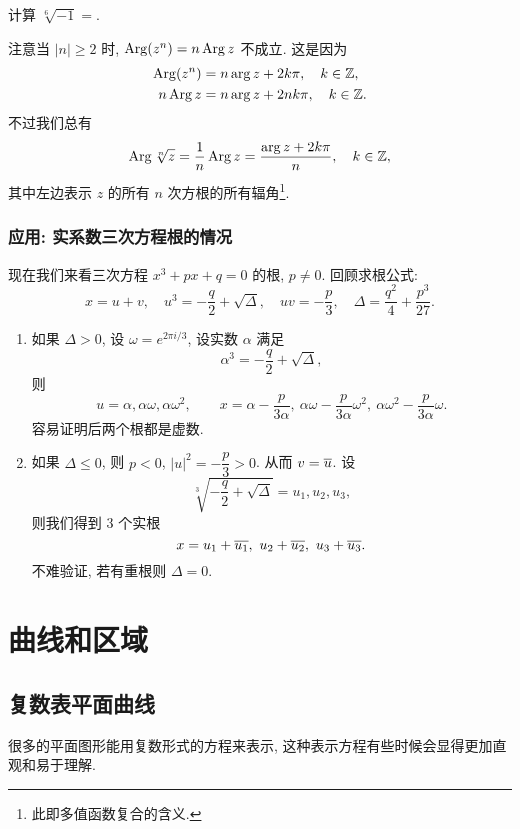 \begin{exercise}
  计算 $\sqrt[6]{-1}=$\fillblank[5cm][2mm]{}.
\end{exercise}

注意当 $|n|\ge 2$ 时, \alert{$\operatorname{Arg}(z^n)=n\operatorname{Arg} z$ 不成立}.
这是因为
  \begin{align*}
    \operatorname{Arg}(z^n)&=n\arg z+2k\pi,\quad k\in{\mathbb{Z}},\\
    n\operatorname{Arg} z&=n\arg z+2nk\pi,\quad k\in{\mathbb{Z}}.
  \end{align*}
不过我们总有
  \[\operatorname{Arg} \sqrt[n]z=\dfrac1n\operatorname{Arg} z=\dfrac{\arg z+2k\pi}n,\quad k\in{\mathbb{Z}},\]
其中左边表示 $z$ 的所有 $n$ 次方根的所有辐角\footnote{此即多值函数复合的含义.}.


\subsubsection*{应用: 实系数三次方程根的情况}
现在我们来看三次方程 $x^3+px+q=0$ 的根, $p\neq 0$.
回顾求根公式:
  \[x=u+v,\quad u^3=-\frac q2+\sqrt{\Delta},\quad uv=-\frac p3,\quad \Delta=\frac{q^2}4+\frac{p^3}{27}.\]
\begin{enumerate}
  \item 如果 $\Delta>0$, 设 $\omega=e^{2\pi i/3}$, 设实数 $\alpha$ 满足
    \[\alpha^3=-\frac q2+\sqrt{\Delta},\]
  则
    \[
      u=\alpha,\alpha\omega,\alpha\omega^2,\qquad
      x=\alpha-\frac p{3\alpha},\ 
        \alpha\omega-\frac p{3\alpha} \omega^2,\ 
        \alpha\omega^2-\frac p{3\alpha} \omega.
    \]
    容易证明后两个根都是虚数.
  \item 如果 $\Delta\le 0$, 则 $p<0$, $|u|^2=-\dfrac p3>0$. 从而 $v=\overline u$.
    设
      \[\sqrt[3]{-\frac q2+\sqrt{\Delta}}=u_1,u_2,u_3,\]
    则我们得到 $3$ 个实根
      \[x=u_1+\ov{u_1},\ u_2+\ov{u_2},\ u_3+\ov{u_3}.\]
    不难验证, 若有重根则 $\Delta=0$.
\end{enumerate}


\section{曲线和区域}

\subsection{复数表平面曲线}

很多的平面图形能用复数形式的方程来表示, 这种表示方程有些时候会显得更加直观和易于理解.

